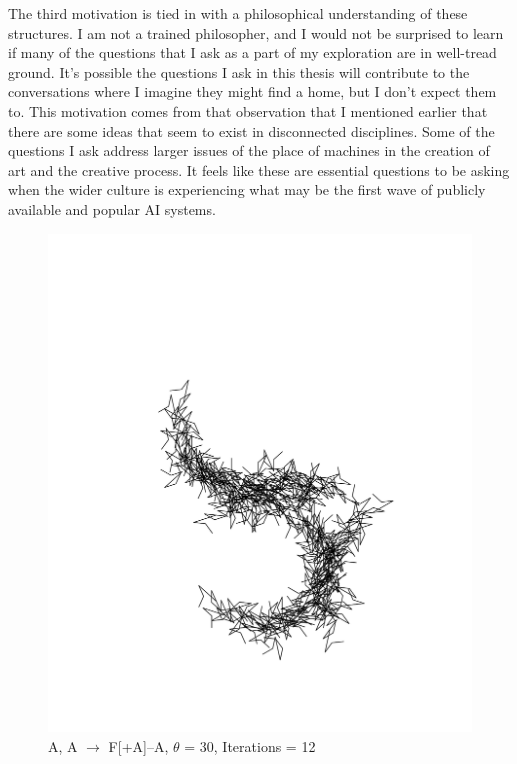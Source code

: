 \documentclass[12pt,twoside]{reedthesis}
\begin{document}
	The third motivation is tied in with a philosophical understanding of these structures. I am not a trained philosopher, and I would not be surprised to learn if many of the questions that I ask as a part of my exploration are in well-tread ground. It’s possible the questions I ask in this thesis will contribute to the conversations where I imagine they might find a home, but I don't expect them to. This motivation comes from that observation that I mentioned earlier that there are some ideas that seem to exist in disconnected disciplines. Some of the questions I ask address larger issues of the place of machines in the creation of art and the creative process. It feels like these are essential questions to be asking when the wider culture is experiencing what may be the first wave of publicly available and popular AI systems.\\
	
	
	\begin{figure}[h]
	\centering
	\includegraphics[clip=true, viewport=1in 4.5in 9in 9in, scale=0.5]{Images/Motivations2}
	\caption{A, A $\rightarrow$ F[+A]–A, $\theta$ = 30, Iterations = 12}
	\label {Acknowledgements 1}
	\end{figure}
	
\end{document}
